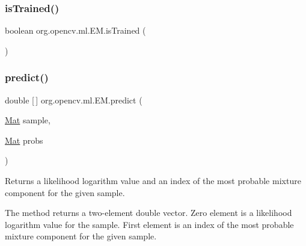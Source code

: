 \mbox{\label{classorg_1_1opencv_1_1ml_1_1_e_m_a957891c7b70c2b2a73b7ef227880223d}} 
\subsubsection{\texorpdfstring{is\+Trained()}{isTrained()}}
{\footnotesize\ttfamily boolean org.\+opencv.\+ml.\+E\+M.\+is\+Trained (\begin{DoxyParamCaption}{ }\end{DoxyParamCaption})}

\mbox{\label{classorg_1_1opencv_1_1ml_1_1_e_m_a5de2bf40f2adf7add3a4dea80c43b9d7}} 
\subsubsection{\texorpdfstring{predict()}{predict()}\hspace{0.1cm}{\footnotesize\ttfamily [1/2]}}
{\footnotesize\ttfamily double \mbox{[}$\,$\mbox{]} org.\+opencv.\+ml.\+E\+M.\+predict (\begin{DoxyParamCaption}\item[{\mbox{\hyperlink{classorg_1_1opencv_1_1core_1_1_mat}{Mat}}}]{sample,  }\item[{\mbox{\hyperlink{classorg_1_1opencv_1_1core_1_1_mat}{Mat}}}]{probs }\end{DoxyParamCaption})}

Returns a likelihood logarithm value and an index of the most probable mixture component for the given sample.

The method returns a two-\/element {\ttfamily double} vector. Zero element is a likelihood logarithm value for the sample. First element is an index of the most probable mixture component for the given sample.


